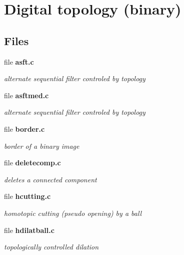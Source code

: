 \section{Digital topology (binary)}
\label{group__topobin}
\subsection*{Files}
\begin{CompactItemize}
\item 
file \bf{asft.c}
\begin{CompactList}\small\item\em alternate sequential filter controled by topology \item\end{CompactList}

\item 
file \bf{asftmed.c}
\begin{CompactList}\small\item\em alternate sequential filter controled by topology \item\end{CompactList}

\item 
file \bf{border.c}
\begin{CompactList}\small\item\em border of a binary image \item\end{CompactList}

\item 
file \bf{deletecomp.c}
\begin{CompactList}\small\item\em deletes a connected component \item\end{CompactList}

\item 
file \bf{hcutting.c}
\begin{CompactList}\small\item\em homotopic cutting (pseudo opening) by a ball \item\end{CompactList}

\item 
file \bf{hdilatball.c}
\begin{CompactList}\small\item\em topologically controlled dilation \item\end{CompactList}


\end{CompactItemize}
